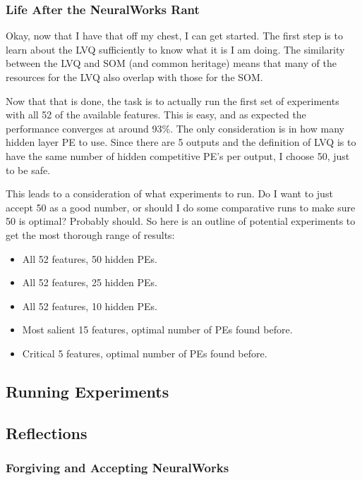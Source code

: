 \documentclass[12pt]{article}
\begin{document}
\subsubsection{Life After the NeuralWorks Rant}

Okay, now that I have that off my chest, I can get started.  The first step is to learn about the LVQ sufficiently to know what it is I am doing.  The similarity between the LVQ and SOM (and common heritage) means that many of the resources for the LVQ also overlap with those for the SOM.  

Now that that is done, the task is to actually run the first set of experiments with all 52 of the available features.  This is easy, and as expected the performance converges at around 93\%.  The only consideration is in how many hidden layer PE to use.  Since there are 5 outputs and the definition of LVQ is to have the same number of hidden competitive PE's per output, I choose 50, just to be safe.  

This leads to a consideration of what experiments to run.  Do I want to just accept 50 as a good number, or should I do some comparative runs to make sure 50 is optimal?  Probably should.  So here is an outline of potential experiments to get the most thorough range of results:

\begin{itemize}

\item All 52 features, 50 hidden PEs.
\item All 52 features, 25 hidden PEs.
\item All 52 features, 10 hidden PEs.
\item Most salient 15 features, optimal number of PEs found before.
\item Critical 5 features, optimal number of PEs found before.

\end{itemize}

\subsection{Running Experiments}



\subsection{Reflections}

\subsubsection{Forgiving and Accepting NeuralWorks}
\end{document}
